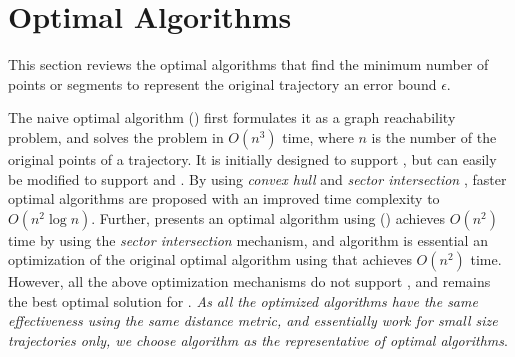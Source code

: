 \section{Optimal Algorithms}
\label{sec-optimal}

This section reviews the optimal \lsa algorithms that find the minimum number of points or segments to represent the original trajectory \wrt an error bound $\epsilon$.

The naive optimal algorithm (\opt) \cite{Imai:Optimal} first formulates it as a graph reachability problem, and solves the problem in  $O(n^3)$ time, where $n$ is the number of the original points of a trajectory. It is initially designed to support \ped, but can easily be modified to support \sed and \dad.
By using \textit{convex hull} \cite{Toussaint:Optimal} and \textit{sector intersection} \cite{Melkman:Optimal}, faster optimal algorithms are proposed with an improved time complexity to $O(n^2 \log n)$. Further, \cite{Chan:Optimal} presents an optimal algorithm using \ped (\optp) achieves $O(n^2)$ time by using the \textit{sector intersection} mechanism, and algorithm  \cite{Long:Direction} is essential an optimization of the original optimal algorithm using \dad that achieves $O(n^2)$ time. However, all the above optimization mechanisms do not support \sed, and \opt remains the best optimal solution for \sed. {\em As all the optimized algorithms have the same effectiveness using the same distance metric, and essentially work for small size trajectories only, we choose algorithm \opt as the representative of optimal \lsa algorithms}.



